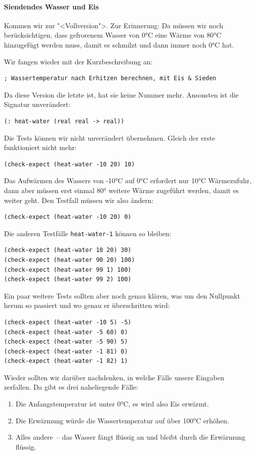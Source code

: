 \paragraph{Siendendes Wasser und Eis} Kommen wir zur "<Vollversion">.
Zur Erinnerung: Da müssen wir noch berücksichtigen, dass gefrorenem
Wasser von 0\si{\degree}C eine Wärme von 80\si{\degree}C hinzugefügt werden muss, damit es
schmilzt und dann immer noch 0\si{\degree}C hat.  

Wir fangen wieder mit der Kurzbeschreibung an:
%
\begin{lstlisting}
; Wassertemperatur nach Erhitzen berechnen, mit Eis & Sieden
\end{lstlisting}
%
Da diese Version die letzte ist, hat sie keine Nummer mehr.  Ansonsten
ist die Signatur unverändert:
%
\begin{lstlisting}
(: heat-water (real real -> real))
\end{lstlisting}
%
Die Tests können wir nicht unverändert übernehmen.  Gleich der erste
funktioniert nicht mehr:
%
\begin{lstlisting}
(check-expect (heat-water -10 20) 10)
\end{lstlisting}
%
Das Aufwärmen des Wassers von -10\si{\degree}C auf 0\si{\degree}C erfordert nur 10\si{\degree}C
Wärmezufuhr, dann aber müssen erst einmal 80\si{\degree} weitere Wärme zugeführt
werden, damit es weiter geht.  Den Testfall müssen wir also ändern:
%
\begin{lstlisting}
(check-expect (heat-water -10 20) 0)
\end{lstlisting}
%
Die anderen Testfälle \lstinline{heat-water-1} können so bleiben:
%
\begin{lstlisting}
(check-expect (heat-water 10 20) 30)
(check-expect (heat-water 90 20) 100)
(check-expect (heat-water 99 1) 100)
(check-expect (heat-water 99 2) 100)
\end{lstlisting}
%
Ein paar weitere Tests sollten aber noch genau klären, was um den
Nullpunkt herum so passiert und wo genau er überschritten wird:
%
\begin{lstlisting}
(check-expect (heat-water -10 5) -5)
(check-expect (heat-water -5 60) 0)
(check-expect (heat-water -5 90) 5)
(check-expect (heat-water -1 81) 0)
(check-expect (heat-water -1 82) 1)
\end{lstlisting}
%
Wieder sollten wir darüber nachdenken, in welche Fälle unsere
Eingaben zerfallen.  Da gibt es drei naheliegende Fälle:
%
\begin{enumerate}
\item Die Anfangstemperatur ist unter 0\si{\degree}C, es wird also Eis erwärmt.
\item Die Erwärmung würde die Wassertemperatur auf über 100\si{\degree}C erhöhen.
\item Alles andere~-- das Wasser fängt flüssig an und bleibt durch die
  Erwärmung flüssig.
\end{enumerate}

